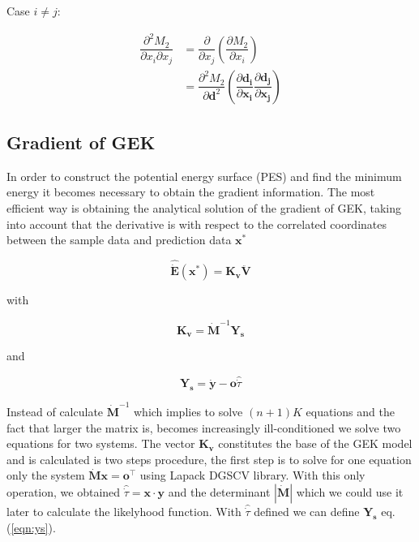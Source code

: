 \documentclass[aps,prb,twocolumn,superscriptaddress,floatfix,longbibliography,10pt]{revtex4-2}
\begin{document}
Case $i \ne j$:

\begin{equation} \label{eqn:Cmatd2ne}
\begin{split}
\dfrac{\partial^2 M_2}{\partial x_i\partial x_j} & = \dfrac{\partial}{\partial x_j} \left(\dfrac{\partial M_2}{\partial x_i}\right) \\
& = \dfrac{\partial^2 M_2}{\partial\mathbf{d}^2} \left(\dfrac{\partial\mathbf{d_i}}{\partial\mathbf{x_i}}\dfrac{\partial\mathbf{d_j}}{\partial\mathbf{x_j}}\right)
\end{split}
\end{equation}

\subsection{Gradient of GEK}

In order to construct the potential energy surface (PES) and find the minimum energy it becomes necessary to obtain the gradient information. The most efficient way is obtaining the analytical solution of the gradient of GEK, taking into account that the derivative is with respect to the correlated coordinates between the sample data and prediction data $\mathbf{x^*}$ 

\begin{equation} \label{eqn:GGEK}
\mathbf{\hat{\dot E}}(\mathbf{x^*}) = \mathbf{K_v}\mathbf{\ddot V}
\end{equation}

with 

\begin{equation} \label{eqn:kv}
\mathbf{K_v} = \mathbf{\dot M}^{-1}\mathbf{Y_s}
\end{equation}

and

\begin{equation} \label{eqn:ys}
\mathbf{Y_s} = \mathbf{\dot y} - \mathbf{o}\hat{\dot \tau}
\end{equation}

Instead of calculate $\mathbf{\dot M}^{-1}$ which implies to solve $(n+1)K$ equations and the fact that larger the matrix is, becomes increasingly ill-conditioned\citep{DeBaar2013} we solve two equations for two systems. The vector $\mathbf{K_v}$ constitutes the base of the GEK model and is calculated is two steps procedure, the first step is to solve for one equation only the system $\mathbf{\dot Mx} = \mathbf{o}^\intercal$ using Lapack DGSCV  library\citep{lapack1999}. With this only operation, we obtained $\hat{\dot \tau} =  \mathbf{x}\cdot\mathbf{y}$ and the determinant $|\mathbf{\dot M}|$ which we could use it later to calculate the likelyhood function. With $\hat{\dot \tau}$ defined we can define $\mathbf{Y_s}$ eq. (\ref{eqn:ys}).
\end{document}
